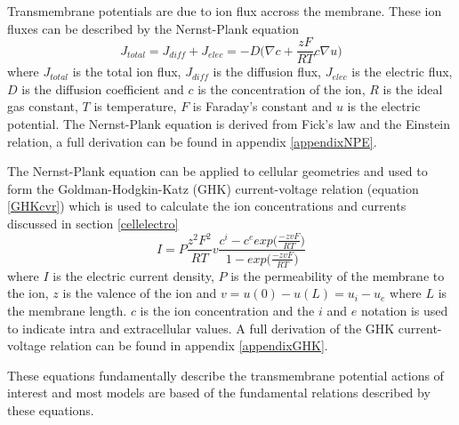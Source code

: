 Transmembrane potentials are due to ion flux accross the membrane. These ion fluxes can be described by the Nernst-Plank equation
\begin{equation}
    J_{total} = J_{diff}+J_{elec} = -D\bigg(\nabla c + \frac{zF}{RT}c\nabla u\bigg)
    \label{nerstplankeq}
\end{equation}
where $J_{total}$ is the total ion flux, $J_{diff}$ is the diffusion flux, $J_{elec}$ is the electric flux, $D$ is the diffusion coefficient and $c$ is the concentration of the ion, $R$ is the ideal gas constant, $T$ is temperature, $F$ is Faraday's constant and $u$ is the electric potential. The Nernst-Plank equation is derived from Fick's law and the Einstein relation, a full derivation can be found in appendix \ref{appendixNPE}. \par
The Nernst-Plank equation can be applied to cellular geometries and used to form the Goldman-Hodgkin-Katz (GHK) current-voltage relation (equation \ref{GHKcvr}) which is used to calculate the ion concentrations and currents discussed in section \ref{cellelectro}
\begin{equation}
    I=P\frac{z^2F^2}{RT}v\frac{c^i-c^eexp\big(\frac{-zvF}{RT}\big)}{1-exp\big(\frac{-zvF}{RT}\big)}
    \label{GHKcvr}
\end{equation}
where $I$ is the electric current density, $P$ is the permeability of the membrane to the ion, $z$ is the valence of the ion and $v = u(0)-u(L) = u_i-u_e$ where $L$ is the membrane length. $c$ is the ion concentration and the $i$ and $e$ notation is used to indicate intra and extracellular values. A full derivation of the GHK current-voltage relation can be found in appendix \ref{appendixGHK}.\par
These equations fundamentally describe the transmembrane potential actions of interest and most models are based of the fundamental relations described by these equations.

